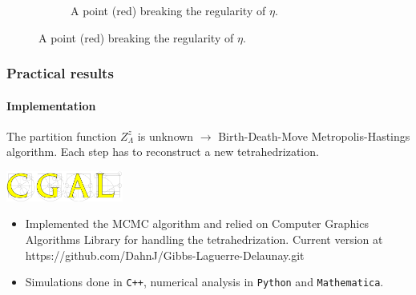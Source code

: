 \documentclass[c, 10pt]{beamer}
\begin{document}
\begin{frame}
\begin{figure}
\begin{minipage}{0.45\textwidth}
\begin{figure}[p]
{
}
\caption{\scriptsize A point (red) breaking the regularity of $\eta$.}
\label{fig:Laguerrecospherical}
\end{figure}
    \end{minipage}
\end{figure}

\vspace{-4mm}

\end{frame}





\begin{frame}\frametitle{Practical results}
	\framesubtitle{Implementation}

	The partition function $Z^z_\Lambda$ is unknown $\rightarrow$ Birth-Death-Move Metropolis-Hastings algorithm. \newline
	Each step has to reconstruct a new tetrahedrization.
	
\begin{center}
\includegraphics[height = 1cm]{./FigureLayout/cgal.png}
\end{center}


\begin{itemize}
	\item Implemented the MCMC algorithm and relied on Computer Graphics Algorithms Library for handling the tetrahedrization. \newline
		{\footnotesize Current version at \alert{https://github.com/DahnJ/Gibbs-Laguerre-Delaunay.git}}
	\item Simulations done in \texttt{C++}, numerical analysis in \texttt{Python} and \texttt{Mathematica}.
\end{itemize}

\end{frame}
\end{document}
